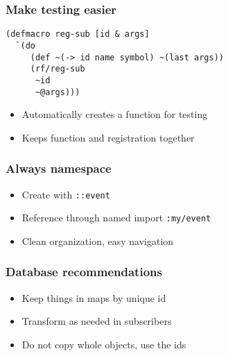 \documentclass{beamer}
\newcommand{\code}[1]{{\color{secondary} \texttt{#1}}}
\begin{document}
  \begin{frame}[fragile]
    \frametitle{Make testing easier}
    \begin{verbatim}
(defmacro reg-sub [id & args]
  `(do
     (def ~(-> id name symbol) ~(last args))
     (rf/reg-sub
      ~id
      ~@args)))
    \end{verbatim}
    \begin{itemize}
      \item Automatically creates a function for testing
      \item Keeps function and registration together
    \end{itemize}
  \end{frame}

  \begin{frame}
    \frametitle{Always namespace}
    \begin{itemize}
      \item Create with \code{::event}
      \item Reference through named import \code{:my/event}
      \item Clean organization, easy navigation
    \end{itemize}
  \end{frame}

  \begin{frame}
    \frametitle{Database recommendations}
    \begin{itemize}
      \item Keep things in maps by unique id
      \item Transform as needed in subscribers
      \item Do not copy whole objects, use the ids
    \end{itemize}
  \end{frame}
\end{document}

